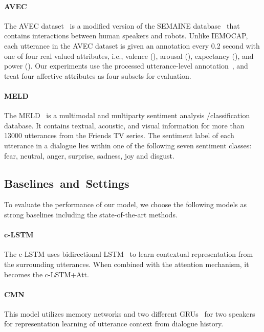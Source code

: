 \documentclass[journal]{IEEEtran}
\begin{document}
\paragraph{AVEC}
The AVEC dataset~\cite{schuller2012avec} is a modified version of the SEMAINE database~\cite{mckeown2011semaine} that contains interactions between human speakers  and robots. Unlike IEMOCAP, each utterance in the AVEC dataset is given an annotation every 0.2 second with one of four real valued attributes, i.e., valence (), arousal (), expectancy (), and power (). Our experiments use the processed utterance-level annotation~\cite{majumder2019dialoguernn}, and treat four affective attributes as four subsets for evaluation.

\paragraph{MELD}
The MELD~\cite{poria2018meld} is a multimodal and multiparty sentiment analysis /classification database. It contains textual, acoustic, and visual information for more than 13000 utterances from the Friends TV series. The sentiment label of each utterance in a dialogue lies within one of the following seven sentiment classes: fear, neutral, anger, surprise, sadness, joy and disgust.
\subsection{Baselines~and~Settings}
To evaluate the performance of our model, we choose the following models as strong baselines including the state-of-the-art methods.



\paragraph{c-LSTM~\cite{poria2017context}}
The c-LSTM uses bidirectional LSTM~\cite{hochreiter1997long} to learn contextual representation from the surrounding utterances. When combined with the attention mechanism, it becomes the c-LSTM+Att.



\paragraph{CMN~\cite{hazarika2018conversational}}
This model utilizes memory networks and two different GRUs~\cite{cho2014learning} for two speakers for representation learning of utterance context from dialogue history.
\end{document}
